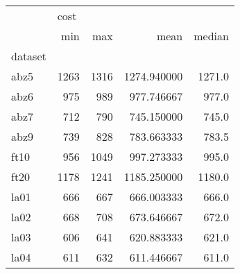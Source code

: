 \begin{tabular}{lrrrr}
\toprule
{} & \multicolumn{4}{l}{cost} \\
{} &   min &   max &         mean &  median \\
dataset &       &       &              &         \\
\midrule
abz5    &  1263 &  1316 &  1274.940000 &  1271.0 \\
abz6    &   975 &   989 &   977.746667 &   977.0 \\
abz7    &   712 &   790 &   745.150000 &   745.0 \\
abz9    &   739 &   828 &   783.663333 &   783.5 \\
ft10    &   956 &  1049 &   997.273333 &   995.0 \\
ft20    &  1178 &  1241 &  1185.250000 &  1180.0 \\
la01    &   666 &   667 &   666.003333 &   666.0 \\
la02    &   668 &   708 &   673.646667 &   672.0 \\
la03    &   606 &   641 &   620.883333 &   621.0 \\
la04    &   611 &   632 &   611.446667 &   611.0 \\
\bottomrule
\end{tabular}
